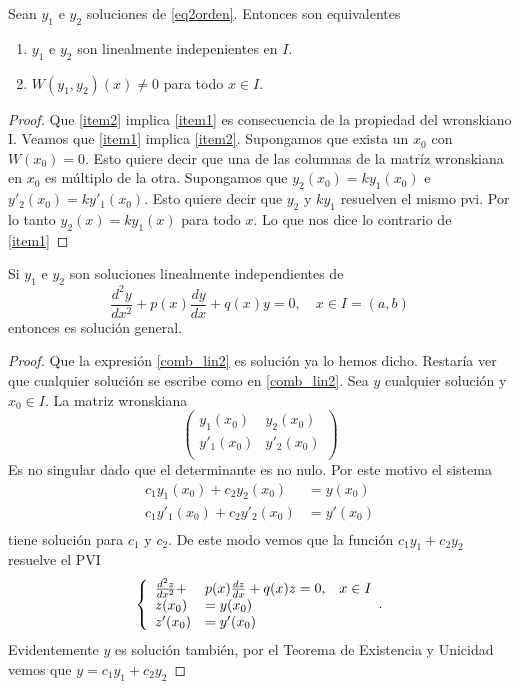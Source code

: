 \begin{teorema}{}
 Sean $y_1$ e $y_2$ soluciones de \eqref{eq2orden}. Entonces son equivalentes
\begin{enumerate}
\item\label{item1} $y_1$ e $y_2$ son linealmente indepenientes en $I$.
\item\label{item2} $W(y_1,y_2)(x)\neq 0$ para todo $x\in I$.
\end{enumerate}
\end{teorema}


\begin{proof} Que \ref{item2} implica \ref{item1} es consecuencia de la propiedad del wronskiano I.
Veamos que \ref{item1} implica \ref{item2}. Supongamos que exista un $x_0$ con $W(x_0)=0$. Esto quiere decir que una de las columnas
de la matríz wronskiana en $x_0$ es múltiplo de la otra. Supongamos que $y_2(x_0)=ky_1(x_0)$ e $y'_2(x_0)=ky'_1(x_0)$. Esto quiere decir que $y_2$ y $ky_1$
resuelven el mismo pvi. Por lo tanto $y_2(x)=ky_1(x)$ para todo $x$. Lo que nos dice lo contrario de \ref{item1}
\end{proof}


\begin{teorema}{}
 Si $y_1$ e $y_2$ son soluciones linealmente independientes de
\[\frac{d^2y}{dx^2}+p(x)\frac{dy}{dx}+q(x)y=0,\quad x\in I=(a,b)\]
entonces
es solución general.
\end{teorema}

\begin{proof} Que la expresión \eqref{comb_lin2} es solución ya lo hemos dicho. Restaría ver que cualquier solución se escribe como en \eqref{comb_lin2}.
Sea $y$ cualquier solución y $x_0\in I$. La matriz wronskiana
\[\begin{pmatrix}
y_1(x_0) & y_2(x_0)\\
y'_1(x_0) & y'_2(x_0)\\
\end{pmatrix}
\]
Es no singular dado que el determinante es no nulo. Por este motivo el sistema
\[ \begin{split}
c_1 y_1(x_0) + c_2y_2(x_0) &=y(x_0)\\
c_1y'_1(x_0) + c_2y'_2(x_0) &=y'(x_0)\\
\end{split}
\]
tiene solución para $c_1$ y $c_2$. De este modo vemos que la función $c_1y_1+c_2y_2$ resuelve el PVI
\[\left\{
\begin{array}{l l l}
\frac{d^2z}{dx^2}+&p(x)\frac{dz}{dx}+q(x)z=0,&x\in I\\
z(x_0)&=y(x_0)&\\
z'(x_0)&=y'(x_0)&\\
\end{array}.\right.
\]
Evidentemente $y$ es solución también, por el Teorema de Existencia y Unicidad vemos que $y=c_1y_1+c_2y_2$ \end{proof}

